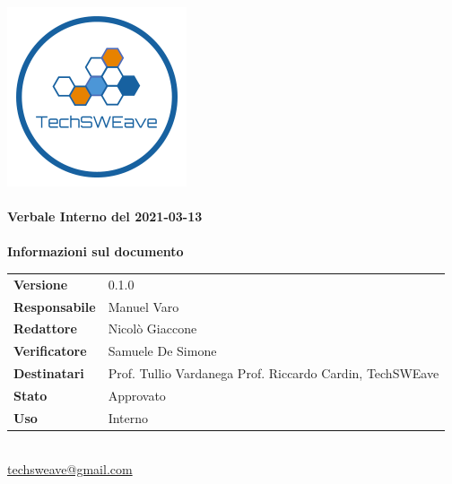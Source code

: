 \documentclass[a4paper]{article}
\begin{document}
        
    \begin{titlepage}
        \begin{center}
            \includegraphics{../../../../Images/logo.png}\\
            \vspace{20px}
            \textcolor{logo}{\hrulefill}\\
            \vspace{20px}
            \textbf{\huge\textcolor{logo}{Verbale Interno del 2021-03-13}}\\
            \vspace{10px}
            \textcolor{logo}{\hrulefill}\\
            \vspace{40px}
            \textbf{\Large Informazioni sul documento}\\
            \vspace{20px}
            \begin{tabular}{p{100px} | p{100px}}
                \textbf{Versione} & 0.1.0\\
                \textbf{Responsabile} & Manuel Varo\\
                \textbf{Redattore} & Nicolò Giaccone\\
                \textbf{Verificatore} & Samuele De Simone\\
                \textbf{Destinatari} & Prof. Tullio Vardanega \newline Prof. Riccardo Cardin, \newline TechSWEave\\
                \textbf{Stato} & Approvato\\
                \textbf{Uso} & Interno\\
            \end{tabular}\\
            \vspace{60px}
            \href{mailto:techsweave@gmail.com}{techsweave@gmail.com}\\
    
        \end{center}
        \end{titlepage}
    
\end{document}
